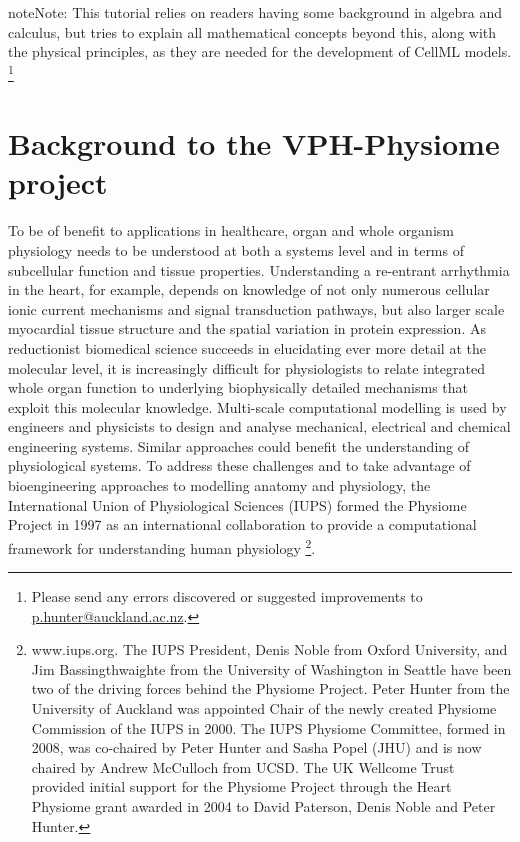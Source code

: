 \documentclass[a4paper,10pt,english]{sphinxmanual}
\begin{document}
\begin{notice}{note}{Note:}
This tutorial relies on readers having some background in
algebra and calculus, but tries to explain all mathematical concepts
beyond this, along with the physical principles, as they are needed for
the development of CellML models. \footnote[5]{
Please send any errors discovered or suggested improvements to \href{mailto:p.hunter@auckland.ac.nz}{p.hunter@auckland.ac.nz}.
}
\end{notice}


\chapter{Background to the VPH-Physiome project}
\label{background::doc}\label{background:background-to-the-vph-physiome-project}\label{background:tutorial-on-cellml-opencor-the-physiome-model-repository}\begin{figure}[H]\begin{flushright}

\texttt{[image: \{sideimage\_background]}.png}
\end{flushright}\end{figure}

To be of benefit to applications in healthcare, organ and whole organism
physiology needs to be understood at both a systems level and in terms
of subcellular function and tissue properties. Understanding a
re-entrant arrhythmia in the heart, for example, depends on knowledge of
not only numerous cellular ionic current mechanisms and signal
transduction pathways, but also larger scale myocardial tissue structure
and the spatial variation in protein expression. As reductionist
biomedical science succeeds in elucidating ever more detail at the
molecular level, it is increasingly difficult for physiologists to
relate integrated whole organ function to underlying biophysically
detailed mechanisms that exploit this molecular knowledge. Multi-scale
computational modelling is used by engineers and physicists to design
and analyse mechanical, electrical and chemical engineering systems.
Similar approaches could benefit the understanding of physiological
systems. To address these challenges and to take advantage of
bioengineering approaches to modelling anatomy and physiology, the
International Union of Physiological Sciences (IUPS) formed the Physiome
Project in 1997 as an international collaboration to provide a
computational framework for understanding human physiology \footnote[1]{
www.iups.org. The IUPS President, Denis Noble from
Oxford University, and Jim Bassingthwaighte from the University of
Washington in Seattle have been two of the driving forces behind the
Physiome Project. Peter Hunter from the University of Auckland was
appointed Chair of the newly created Physiome Commission of the IUPS
in 2000. The IUPS Physiome Committee, formed in 2008, was co-chaired
by Peter Hunter and Sasha Popel (JHU) and is now chaired by Andrew
McCulloch from UCSD. The UK Wellcome Trust provided initial support
for the Physiome Project through the Heart Physiome grant awarded in
2004 to David Paterson, Denis Noble and Peter Hunter.
}.
\end{document}
